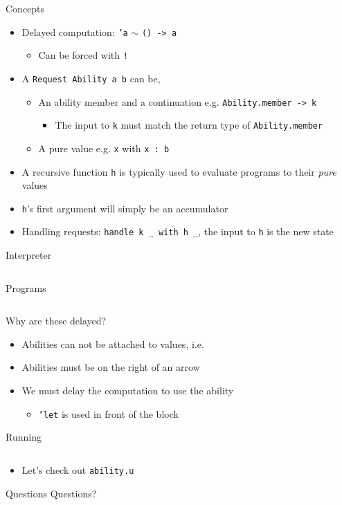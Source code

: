 \documentclass[hyperref={pdfpagelabels=false},12pt]{beamer}
\newcommand{\code}[2]{\texttt{#2}}
\newcommand{\txt}[1]{\code{text}{#1}}
\newcommand{\bash}[1]{\code{bash}{#1}}
\newcommand{\pygmentLines}[5]{\inputminted[bgcolor=lightgray,linenos,fontsize=#1,firstline=#2,lastline=#3,autogobble]{#4}{#5}}
\begin{document}
\begin{frame}{Concepts}
  \begin{itemize}
    \item Delayed computation: \txt{'a} $\sim$ \txt{() -> a}
    \begin{itemize}
      \item Can be forced with \txt{!}
    \end{itemize}
    \item A \txt{Request {Ability a} b} can be,
      \begin{itemize}
        \item An ability member and a continuation e.g. \txt{{Ability.member -> k}}
        \begin{itemize}
          \item The input to \txt{k} must match the return type of
            \txt{Ability.member}
        \end{itemize}
        \item A pure value e.g. \txt{{x}} with \txt{x : b}
      \end{itemize}
    \item A recursive function \txt{h} is typically used to evaluate programs
      to their \textit{pure} values
    \item \txt{h}'s first argument will simply be an accumulator
    \item Handling requests: \txt{handle k _ with h _}, the input to
      \txt{h} is the new state
  \end{itemize}
\end{frame}

\begin{frame}{Interpreter}
  \pygmentLines{\footnotesize}{11}{21}{text}{code/ability.u}
\end{frame}

\begin{frame}{Programs}
  \pygmentLines{\footnotesize}{23}{40}{text}{code/ability.u}
\end{frame}

\begin{frame}{Why are these delayed?}
  \begin{itemize}
    \item Abilities can not be attached to values, i.e. \xcancel{\txt{{Ability a} b}}
    \item Abilities must be on the right of an arrow
    \item We must delay the computation to use the ability
    \begin{itemize}
      \item \txt{'let} is used in front of the block
    \end{itemize}
  \end{itemize}
\end{frame}

\begin{frame}{Running}
  \pygmentLines{\footnotesize}{2}{4}{text}{code/ability.u}
  \begin{itemize}
    \item Let's check out \bash{ability.u}
  \end{itemize}
\end{frame}

\begin{frame}{Questions}
  \Huge Questions?
\end{frame}
\end{document}
